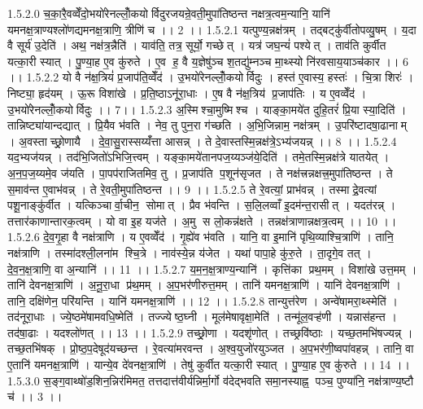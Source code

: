1.5.2.0
च॒का॒रै॒वव्वेँदो॒भयो॑रेनल्लोँ॒कयोर्विदुरजयन्रे॒वती॒मुपा॑तिष्ठन्त नक्षत्र॒त्वम॒न्यानि॒ यानि॑ यमनक्ष॒त्राण्यश्लो॑णद्यमनक्ष॒त्राणि॒ त्रीणि॑ च ।। 2 ।।
1.5.2.1
यत्पुण्य॒न्नक्ष॑त्रम् । तद्बट्कु॑र्वीतोपव्यु॒षम् । य॒दा वै सूर्य॑ उ॒देति॑ । अथ॒ नक्ष॑त्र॒न्नैति॑ । याव॑ति॒ तत्र॒ सूर्यो॒ गच्छेत् । यत्र॑ जघ॒न्यं॑ पश्येत् । ताव॑ति कुर्वीत यत्का॒री स्यात् । पु॒ण्या॒ह ए॒व कु॑रुते । ए॒व ह॒ वै य॒ज्ञेषु॑ञ्च श॒तद्यु॑म्नञ्च मा॒थ्स्यो नि॑रवसाय॒याञ्च॑कार ।। 6 ।।
1.5.2.2
यो वै न॑क्ष॒त्रियं॑ प्र॒जाप॑ति॒व्वेँद॑ । उ॒भयो॑रेनल्लोँ॒कयोर्विदुः । हस्त॑ ए॒वास्य॒ हस्तः॑ । चि॒त्रा शिरः॑ । निष्ट्या॒ हृद॑यम् । ऊ॒रू विशा॑खे । प्र॒ति॒ष्ठाऽनू॑रा॒धाः । ए॒ष वै न॑क्ष॒त्रिय॑ प्र॒जाप॑तिः । य ए॒वव्वेँद॑ । उ॒भयो॑रेनल्लोँ॒कयोर्विदुः ।। 7।।
1.5.2.3
अ॒स्मिश्चा॒मुष्मि॑श्च । याङ्का॒मये॑त दुहि॒तरं॑ प्रि॒या स्या॒दिति॑ । तान्निष्ट्या॑यान्दद्यात् । प्रि॒यैव भ॑वति । नेव॒ तु पुन॒रा ग॑च्छति । अ॒भि॒जिन्नाम॒ नक्ष॑त्रम् । उ॒परि॑ष्टादषा॒ढानाम् । अ॒वस्ताच्छ्रो॒णायै । दे॒वा॒सु॒रास्सय्यँ॑त्ता आसन्न् । ते दे॒वास्तस्मि॒न्नक्ष॑त्रे॒ऽभ्य॑जयन्न् ।। 8 ।।
1.5.2.4
यद॒भ्यज॑यन्न् । तद॑भि॒जितो॑ऽभिजि॒त्त्वम् । यङ्का॒मये॑तानपज॒य्यञ्ज॑ये॒दिति॑ । तमे॒तस्मि॒न्नक्ष॑त्रे यातयेत् । अ॒न॒प॒ज॒य्यमे॒व ज॑यति । पा॒पप॑राजितमिव॒ तु । प्र॒जाप॑ति प॒शून॑सृजत । ते नक्ष॑त्त्रन्नक्षत्त्र॒मुपा॑तिष्ठन्त । ते स॒माव॑न्त ए॒वाभ॑वन्न् । ते रे॒वती॒मुपा॑तिष्ठन्त ।। 9 ।।
1.5.2.5
ते रे॒वत्यां॒ प्राभ॑वन्न् । तस्माद्रे॒वत्यां पशू॒नाङ्कु॑र्वीत । यत्किञ्चार्वा॒चीन॒॒ सोमात् । प्रैव भ॑वन्ति । स॒लि॒लव्वाँ इ॒दम॑न्त॒रासीत् । यदत॑रन्न् । तत्तार॑काणान्तारक॒त्वम् । यो वा इ॒ह यज॑ते । अ॒मु स लो॒कन्न॑क्षते । तन्नक्ष॑त्राणान्नक्षत्र॒त्वम् ।। 10 ।।
1.5.2.6
दे॒व॒गृ॒हा वै नक्ष॑त्राणि । य ए॒वव्वेँद॑ । गृ॒ह्ये॑व भ॑वति । यानि॒ वा इ॒मानि॑ पृथि॒व्याश्चि॒त्राणि॑ । तानि॒ नक्ष॑त्राणि । तस्मा॑दश्ली॒लना॑म श्चि॒त्रे । नाव॑स्ये॒न्न य॑जेत । यथा॑ पापा॒हे कु॑रु॒ते । ता॒दृगे॒व तत् । दे॒व॒न॒क्ष॒त्राणि॒ वा अ॒न्यानि॑ ।। 11 ।।
1.5.2.7
य॒म॒न॒क्ष॒त्राण्य॒न्यानि॑ । कृत्ति॑का प्रथ॒मम् । विशा॑खे उत्त॒मम् । तानि॑ देवनक्ष॒त्राणि॑ । अ॒नू॒रा॒धा प्र॑थ॒मम् । अ॒प॒भर॑णीरुत्त॒मम् । तानि॑ यमनक्ष॒त्राणि॑ । यानि॑ देवनक्ष॒त्राणि॑ । तानि॒ दक्षि॑णेन॒ परि॑यन्ति । यानि॑ यमनक्ष॒त्राणि॑ ।। 12 ।।
1.5.2.8
तान्युत्त॑रेण । अन्वे॑षामरा॒थ्स्मेति॑ । तद॑नूरा॒धाः । ज्ये॒ष्ठमे॑षामवधि॒ष्मेति॑ । तज्ज्येष्ठ॒घ्नी । मूल॑मेषावृक्षा॒मेति॑ । तन्मू॑ल॒वऱ्ह॑णी । यन्नास॑हन्त । तद॑षा॒ढाः । यदश्लो॑णत् ।। 13 ।।
1.5.2.9
तच्छ्रो॒णा । यदशृ॑णोत् । तच्छ्रवि॑ष्ठाः । यच्छ॒तमभि॑षज्यन्न् । तच्छ॒तभि॑षक् । प्रो॒ष्ठ॒प॒देषूद॑यच्छन्त । रे॒वत्या॑मरवन्त । अ॒श्व॒युजो॑रयुञ्जत । अ॒प॒भर॑णी॒ष्वपा॑वहन्न् । तानि॒ वा ए॒तानि॑ यमनक्ष॒त्राणि॑ । यान्ये॒व दे॑वनक्ष॒त्राणि॑ । तेषु॑ कुर्वीत यत्का॒री स्यात् । पु॒ण्या॒ह ए॒व कु॑रुते ।। 14 ।।
1.5.3.0
स॒ङ्ग॒वाथ्षो॑ड॒शिन॒न्निर॑मिमत॒ तत्तदात्त॑वीर्यन्निर्मा॒र्गो व॑देद्भवति समा॒नस्याह्न॒ पञ्च॒ पुण्या॑नि॒ नक्ष॑त्राण्य॒ष्टौ च॑ ।। 3 ।।
